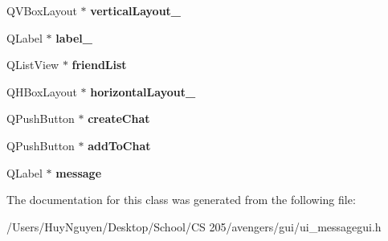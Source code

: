 \begin{DoxyCompactItemize}
\item 
Q\+V\+Box\+Layout $\ast$ {\bfseries vertical\+Layout\+\_}\hypertarget{classUi__MessageGUI_ae27ebdb1c3635e2107a10178742ed275}{}\label{classUi__MessageGUI_ae27ebdb1c3635e2107a10178742ed275}

\item 
Q\+Label $\ast$ {\bfseries label\+\_}\hypertarget{classUi__MessageGUI_a7d9e3260edc709425f4829e3502f9f39}{}\label{classUi__MessageGUI_a7d9e3260edc709425f4829e3502f9f39}

\item 
Q\+List\+View $\ast$ {\bfseries friend\+List}\hypertarget{classUi__MessageGUI_aa9f60aa64d2f55e8e42fb0e9f343c1bd}{}\label{classUi__MessageGUI_aa9f60aa64d2f55e8e42fb0e9f343c1bd}

\item 
Q\+H\+Box\+Layout $\ast$ {\bfseries horizontal\+Layout\+\_}\hypertarget{classUi__MessageGUI_a912c0f19a00f51997f22458331f1009f}{}\label{classUi__MessageGUI_a912c0f19a00f51997f22458331f1009f}

\item 
Q\+Push\+Button $\ast$ {\bfseries create\+Chat}\hypertarget{classUi__MessageGUI_ae14dda461c6fa8a06a84697fcb2aa8be}{}\label{classUi__MessageGUI_ae14dda461c6fa8a06a84697fcb2aa8be}

\item 
Q\+Push\+Button $\ast$ {\bfseries add\+To\+Chat}\hypertarget{classUi__MessageGUI_a1f1dd31adcd37d748c35f9fb78573e40}{}\label{classUi__MessageGUI_a1f1dd31adcd37d748c35f9fb78573e40}

\item 
Q\+Label $\ast$ {\bfseries message}\hypertarget{classUi__MessageGUI_ac37fd76e64f6dc99f8c82483b042d213}{}\label{classUi__MessageGUI_ac37fd76e64f6dc99f8c82483b042d213}

\end{DoxyCompactItemize}


The documentation for this class was generated from the following file\+:\begin{DoxyCompactItemize}
\item 
/\+Users/\+Huy\+Nguyen/\+Desktop/\+School/\+C\+S 205/avengers/gui/ui\+\_\+messagegui.\+h\end{DoxyCompactItemize}
